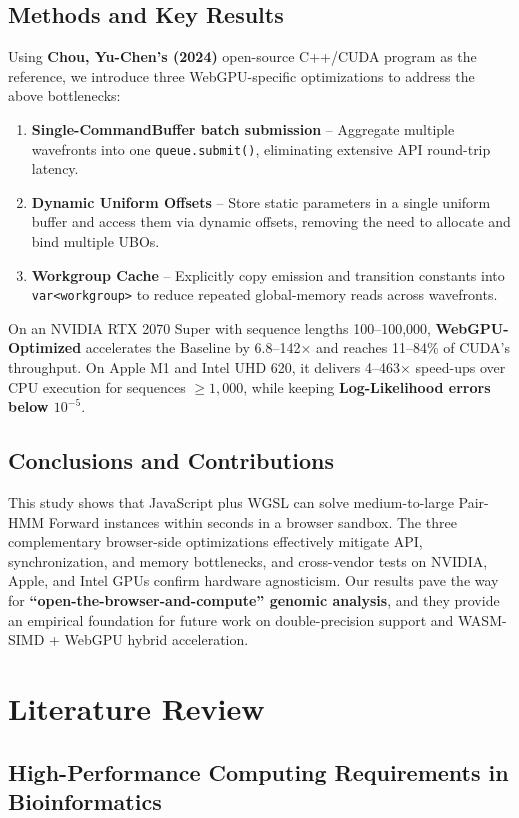 \documentclass[12pt]{report}
\begin{document}
\section{Methods and Key Results}
Using \textbf{Chou, Yu-Chen’s (2024)} open-source C++/CUDA program as the reference, we introduce three WebGPU-specific optimizations to address the above bottlenecks:
\begin{enumerate}
    \item \textbf{Single-CommandBuffer batch submission} – Aggregate multiple wavefronts into one \texttt{queue.submit()}, eliminating extensive API round-trip latency.
    \item \textbf{Dynamic Uniform Offsets} – Store static parameters in a single uniform buffer and access them via dynamic offsets, removing the need to allocate and bind multiple UBOs.
    \item \textbf{Workgroup Cache} – Explicitly copy emission and transition constants into \texttt{var<workgroup>} to reduce repeated global-memory reads across wavefronts.
\end{enumerate}
On an NVIDIA RTX 2070 Super with sequence lengths 100–100,000, \textbf{WebGPU-Optimized} accelerates the Baseline by 6.8–142$\times$ and reaches 11–84\% of CUDA’s throughput. On Apple M1 and Intel UHD 620, it delivers 4–463$\times$ speed-ups over CPU execution for sequences $\geq 1,000$, while keeping \textbf{Log-Likelihood errors below $10^{-5}$}.

\section{Conclusions and Contributions}
This study shows that JavaScript plus WGSL can solve medium-to-large Pair-HMM Forward instances within seconds in a browser sandbox. The three complementary browser-side optimizations effectively mitigate API, synchronization, and memory bottlenecks, and cross-vendor tests on NVIDIA, Apple, and Intel GPUs confirm hardware agnosticism. Our results pave the way for \textbf{``open-the-browser-and-compute'' genomic analysis}, and they provide an empirical foundation for future work on double-precision support and WASM-SIMD + WebGPU hybrid acceleration.

\chapter{Literature Review}
\section{High-Performance Computing Requirements in Bioinformatics}
\end{document}

